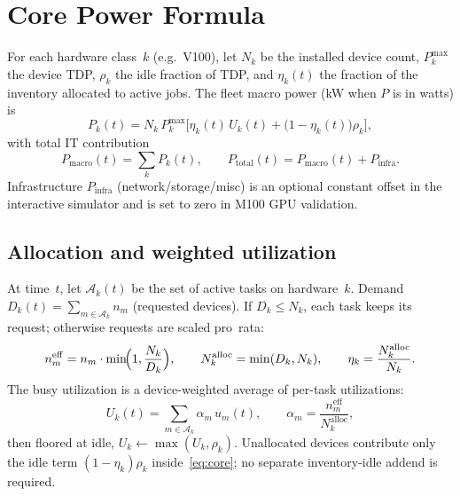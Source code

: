 \documentclass[10pt,a4paper,twocolumn]{article}
\begin{document}
\section{Core Power Formula}
\label{sec:formula}

For each hardware class~$k$ (e.g.\ V100), let $N_k$ be the installed device
count, $P_k^{\max}$ the device TDP, $\rho_k$ the idle fraction of TDP, and
$\eta_k(t)$ the fraction of the inventory allocated to active jobs. The fleet
macro power (kW when $P$ is in watts) is
\begin{equation}
  P_k(t) = N_k\,P_k^{\max}
  \bigl[\eta_k(t)\,U_k(t) + \bigl(1-\eta_k(t)\bigr)\rho_k\bigr],
  \label{eq:core}
\end{equation}
with total IT contribution
\begin{equation}
  P_{\mathrm{macro}}(t)=\sum_k P_k(t),\qquad
  P_{\mathrm{total}}(t)=P_{\mathrm{macro}}(t)+P_{\mathrm{infra}}.
  \label{eq:total}
\end{equation}
Infrastructure $P_{\mathrm{infra}}$ (network/storage/misc) is an optional
constant offset in the interactive simulator and is set to zero in M100 GPU
validation.

\subsection{Allocation and weighted utilization}

At time~$t$, let $\mathcal{A}_k(t)$ be the set of active tasks on hardware~$k$.
Demand $D_k(t)=\sum_{m\in\mathcal{A}_k} n_m$ (requested devices). If
$D_k\le N_k$, each task keeps its request; otherwise requests are scaled
pro~rata:
\begin{equation}
  n_m^{\mathrm{eff}} = n_m\cdot\min\!\Bigl(1,\frac{N_k}{D_k}\Bigr),\qquad
  N_k^{\mathrm{alloc}}=\min(D_k,N_k),\qquad
  \eta_k=\frac{N_k^{\mathrm{alloc}}}{N_k}.
\end{equation}
The busy utilization is a device-weighted average of per-task utilizations:
\begin{equation}
  U_k(t)=\sum_{m\in\mathcal{A}_k}
  \alpha_m\,u_m(t),\qquad
  \alpha_m=\frac{n_m^{\mathrm{eff}}}{N_k^{\mathrm{alloc}}},
  \label{eq:Uk}
\end{equation}
then floored at idle, $U_k\leftarrow\max(U_k,\rho_k)$. Unallocated devices
contribute only the idle term $(1-\eta_k)\rho_k$ inside~\eqref{eq:core}; no
separate inventory-idle addend is required.
\end{document}
